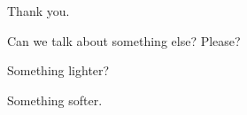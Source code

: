 \label{ally:12}
\begin{paracol}{2}
  \begin{leftcolumn}

\null
\vfill
\begin{ally}
Thank you.
\end{ally}
Can we talk about something else? Please?

\begin{ally}
Something lighter?
\end{ally}
Something softer.
\vfill
\newpage
\end{leftcolumn}
\end{paracol}
